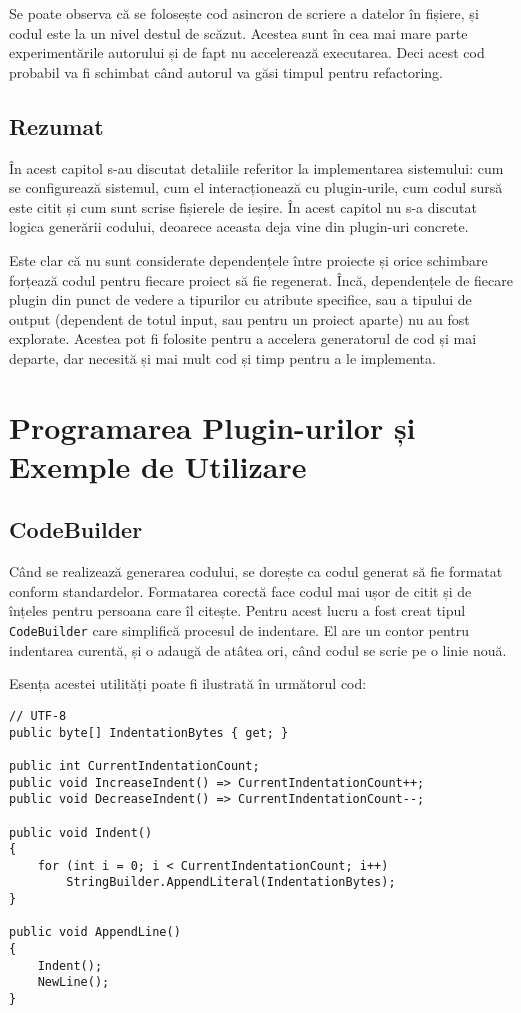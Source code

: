 \documentclass[a4paper,12pt]{report}
\begin{document}
Se poate observa că se folosește cod asincron de scriere a datelor în fișiere, și codul este la un nivel destul de scăzut.
Acestea sunt în cea mai mare parte experimentările autorului și de fapt nu accelerează executarea.
Deci acest cod probabil va fi schimbat când autorul va găsi timpul pentru refactoring.

\section{Rezumat}

În acest capitol s-au discutat detaliile referitor la implementarea sistemului: cum se configurează sistemul, cum el interacționează cu plugin-urile, cum codul sursă este citit și cum sunt scrise fișierele de ieșire.
În acest capitol nu s-a discutat logica generării codului, deoarece aceasta deja vine din plugin-uri concrete.

Este clar că nu sunt considerate dependențele între proiecte și orice schimbare forțează codul pentru fiecare proiect să fie regenerat.
Încă, dependențele de fiecare plugin din punct de vedere a tipurilor cu atribute specifice, sau a tipului de output (dependent de totul input, sau pentru un proiect aparte) nu au fost explorate.
Acestea pot fi folosite pentru a accelera generatorul de cod și mai departe, dar necesită și mai mult cod și timp pentru a le implementa.

\chapter{Programarea Plugin-urilor și Exemple de Utilizare}

\section{CodeBuilder}

Când se realizează generarea codului, se dorește ca codul generat să fie formatat conform standardelor.
Formatarea corectă face codul mai ușor de citit și de înțeles pentru persoana care îl citește.
Pentru acest lucru a fost creat tipul \texttt{CodeBuilder} care simplifică procesul de indentare.
El are un contor pentru indentarea curentă, și o adaugă de atâtea ori, când codul se scrie pe o linie nouă.

Esența acestei utilități poate fi ilustrată în următorul cod:

\begin{verbatim}
// UTF-8
public byte[] IndentationBytes { get; }

public int CurrentIndentationCount;
public void IncreaseIndent() => CurrentIndentationCount++;
public void DecreaseIndent() => CurrentIndentationCount--;

public void Indent()
{
    for (int i = 0; i < CurrentIndentationCount; i++)
        StringBuilder.AppendLiteral(IndentationBytes);
}

public void AppendLine() 
{ 
    Indent();
    NewLine();
}
\end{verbatim}
\end{document}
